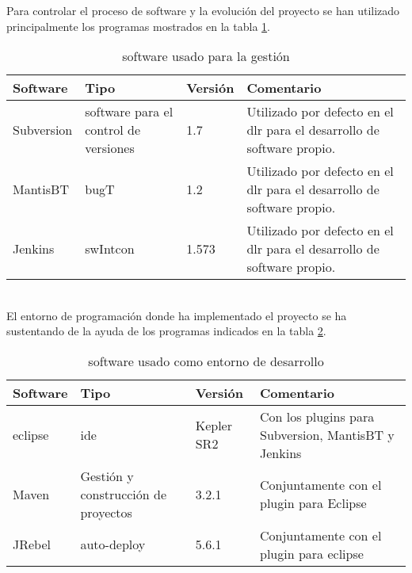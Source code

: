 Para controlar el proceso de \gls{software} y la evolución del proyecto se han utilizado principalmente los programas mostrados en la tabla \ref{table:softgest}.

\begin{center}
\begin {table}[H]
\centering
    \begin{tabular}{ | p{3cm}  p{4cm}   p{3cm}   p{5cm} |}
    \hline
    \textbf{Software} & \textbf{Tipo} & \textbf{Versión} & \textbf{Comentario} \\ \hline
    Subversion & \Gls{software} para el control de versiones & 1.7 & Utilizado por defecto en el \gls{dlr} para el desarrollo de \gls{software} propio. \\ \hline
    MantisBT & \Gls{bugT} & 1.2 & Utilizado por defecto en el \gls{dlr} para el desarrollo de \gls{software} propio. \\ \hline
    Jenkins & \Gls{swIntcon} & 1.573 & Utilizado por defecto en el \gls{dlr} para el desarrollo de \gls{software} propio. \\ \hline
    \end{tabular}
    \caption{\Gls{software} usado para la gestión}
    \label{table:softgest}
    \end{table}
\end{center}

\\
El entorno de programación donde ha implementado el proyecto se ha sustentando de la ayuda de los programas indicados en la tabla \ref{table:softdev}.

\begin{center}
\begin {table}[H]
\centering
    \begin{tabular}{ | p{3cm}  p{4cm}   p{3cm}   p{5cm} |}
    \hline
    \textbf{Software} & \textbf{Tipo} & \textbf{Versión} & \textbf{Comentario} \\ \hline
    \Gls{eclipse} & \gls{ide} & Kepler SR2 & Con los \glspl{plugin} para Subversion, MantisBT y Jenkins  \\ \hline
    Maven & Gestión y construcción de proyectos & 3.2.1 & Conjuntamente con el \gls{plugin} para Eclipse \\ \hline
    JRebel & auto-\Gls{deploy} & 5.6.1 & Conjuntamente con el \gls{plugin} para \gls{eclipse} \\ \hline
    \end{tabular}
    \caption{\Gls{software} usado como entorno de desarrollo}
    \label{table:softdev}
  \end{table}
\end{center}

